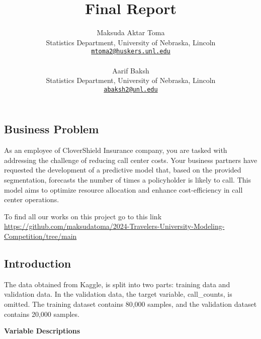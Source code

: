 \documentclass[
  10pt,
  letterpaper,
  twocolumn]{article}
\title{Final Report}
\author{
Maksuda Aktar Toma\\
Statistics Department, University of Nebraska, Lincoln\\
{\tt \href{mailto:mtoma2@huskers.unl.edu}{mtoma2@huskers.unl.edu}}\\
\\\And
Aarif Baksh\\
Statistics Department, University of Nebraska, Lincoln\\
{\tt \href{mailto:abaksh2@unl.edu}{abaksh2@unl.edu}}\\
}
\date{}
\begin{document}
\maketitle
\ifdefined\Shaded\renewenvironment{Shaded}{\begin{tcolorbox}[enhanced, borderline west={3pt}{0pt}{shadecolor}, frame hidden, interior hidden, sharp corners, breakable, boxrule=0pt]}{\end{tcolorbox}}\fi

\hypertarget{business-problem}{%
\subsection{Business Problem}\label{business-problem}}

As an employee of CloverShield Insurance company, you are tasked with
addressing the challenge of reducing call center costs. Your business
partners have requested the development of a predictive model that,
based on the provided segmentation, forecasts the number of times a
policyholder is likely to call. This model aims to optimize resource
allocation and enhance cost-efficiency in call center operations.

To find all our works on this project go to this link
\url{https://github.com/maksudatoma/2024-Travelers-University-Modeling-Competition/tree/main}

\hypertarget{introduction}{%
\subsection{Introduction}\label{introduction}}

The data obtained from Kaggle, is split into two parts: training data
and validation data. In the validation data, the target variable,
call\_counts, is omitted. The training dataset contains 80,000 samples,
and the validation dataset contains 20,000 samples.

\textbf{Variable Descriptions}
\end{document}
